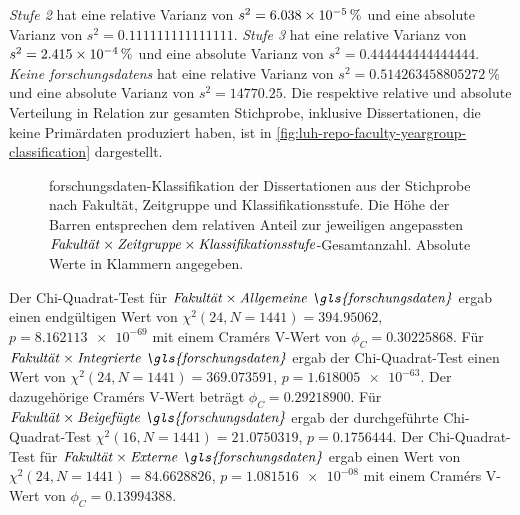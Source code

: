 \textit{Stufe 2} hat eine relative Varianz von $s^2=\SI[round-mode=places,round-precision=3]{6.03791812583022E-05}{\percent}$ und eine absolute Varianz von $s^2=\num[round-mode=places,round-precision=3]{0.111111111111111}$.
\textit{Stufe 3} hat eine relative Varianz von $s^2=\SI[round-mode=places,round-precision=3]{2.41516725033209E-04}{\percent}$ und eine absolute Varianz von $s^2=\num[round-mode=places,round-precision=3]{0.444444444444444}$.
\textit{Keine \glspl{forschungsdaten}} hat eine relative Varianz von $s^2=\SI[round-mode=places,round-precision=3]{0.514263458805272}{\percent}$ und eine absolute Varianz von $s^2=\num[round-mode=places,round-precision=3]{14770.25}$.
%
Die respektive relative und absolute Verteilung in Relation zur gesamten Stichprobe, inklusive Dissertationen, die keine Primärdaten produziert haben, ist in \cref{fig:luh-repo-faculty-yeargroup-classification} dargestellt.

\begin{figure}[!htbp]
    \resizebox{\ifdim\width>\textwidth\textwidth\else\width\fi}{!}{}
    \caption{\gls{forschungsdaten}-Klassifikation der Dissertationen aus der Stichprobe nach Fakultät, Zeitgruppe und Klassifikationsstufe.
    Die Höhe der Barren entsprechen dem relativen Anteil zur jeweiligen angepassten $\text{\textit{Fakultät}}\times\text{\textit{Zeitgruppe}}\times\text{\textit{Klassifikationsstufe}}$-Gesamtanzahl.
    Absolute Werte in Klammern angegeben.}
    \label{fig:luh-repo-faculty-yeargroup-classification-adjusted}
\end{figure}

Der Chi-Quadrat-Test für $\text{\textit{Fakultät}}\times\text{\textit{Allgemeine \gls{forschungsdaten}}}$ ergab einen endgültigen Wert von $\chi^2 (\num{24}, N = \num{1441}) = \num[round-mode=places,round-precision=3]{394.95062}$, $p = \num[round-mode=places,round-precision=3]{8.162113e-69}$ mit einem Cramérs V-Wert von $\phi_C=\num[round-mode=places,round-precision=3]{0.30225868}$.
Für $\text{\textit{Fakultät}}\times\text{\textit{Integrierte \gls{forschungsdaten}}}$ ergab der Chi-Quadrat-Test einen Wert von $\chi^2 (\num{24}, N = \num{1441}) = \num[round-mode=places,round-precision=3]{369.073591}$, $p = \num[round-mode=places,round-precision=3]{1.618005e-63}$.
Der dazugehörige Cramérs V-Wert beträgt $\phi_C=\num[round-mode=places,round-precision=3]{0.29218900}$.
Für $\text{\textit{Fakultät}}\times\text{\textit{Beigefügte \gls{forschungsdaten}}}$ ergab der durchgeführte Chi-Quadrat-Test $\chi^2 (\num{16}, N = \num{1441}) = \num[round-mode=places,round-precision=3]{21.0750319}$, $p = \num[round-mode=places,round-precision=3]{0.1756444}$.
Der Chi-Quadrat-Test für $\text{\textit{Fakultät}}\times\text{\textit{Externe \gls{forschungsdaten}}}$ ergab einen Wert von $\chi^2 (\num{24}, N = \num{1441}) = \num[round-mode=places,round-precision=3]{84.6628826}$, $p = \num[round-mode=places,round-precision=3]{1.081516e-08}$ mit einem Cramérs V-Wert von $\phi_C=\num[round-mode=places,round-precision=3]{0.13994388}$.

